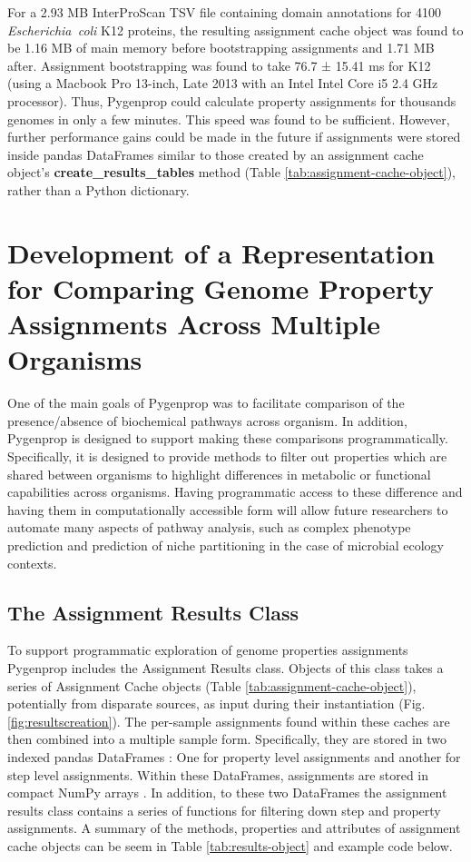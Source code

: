 For a 2.93 MB InterProScan TSV file containing domain annotations for 4100 \textit{Escherichia\ coli }K12 proteins, the resulting assignment cache object was found to be 1.16 MB of main memory before bootstrapping assignments and 1.71 MB after. Assignment bootstrapping was found to take 76.7 ± 15.41 ms for K12 (using a Macbook Pro 13-inch, Late 2013 with an Intel Intel Core i5 2.4 GHz processor). Thus, Pygenprop could calculate property assignments for thousands genomes in only a few minutes. This speed was found to be sufficient. However, further performance gains could be made in the future if assignments were stored inside pandas DataFrames \cite{mckinney2010data} similar to those created by an assignment cache object's \textbf{create\_results\_tables} method (Table \ref{tab:assignment-cache-object}), rather than a Python dictionary.

\section{Development of a Representation for Comparing Genome Property Assignments Across Multiple Organisms}

One of the main goals of Pygenprop was to facilitate comparison of the presence/absence of biochemical pathways across organism. In addition, Pygenprop is designed to support making these comparisons programmatically. Specifically, it is designed to provide methods to filter out properties which are shared between organisms to highlight differences in metabolic or functional capabilities across organisms. Having programmatic access to these difference and having them in computationally accessible form will allow future researchers to automate many aspects of pathway analysis, such as complex phenotype prediction and prediction of niche partitioning in the case of microbial ecology contexts.

\subsection{The Assignment Results Class}

To support programmatic exploration of genome properties assignments Pygenprop includes the Assignment Results class.  Objects of this class takes a series of Assignment Cache objects (Table \ref{tab:assignment-cache-object}), potentially from disparate sources, as input during their instantiation (Fig. \ref{fig:resultscreation}). The per-sample assignments found within these caches are then combined into a multiple sample form. Specifically, they are stored in two indexed pandas DataFrames \cite{mckinney2010data}: One for property level assignments and another for step level assignments. Within these DataFrames, assignments are stored in compact NumPy arrays \cite{van2011numpy}. In addition, to these two DataFrames the assignment results class contains a series of functions for filtering down step and property assignments.  A summary of the methods, properties and attributes of assignment cache objects can be seem in Table \ref{tab:results-object} and example code below.

